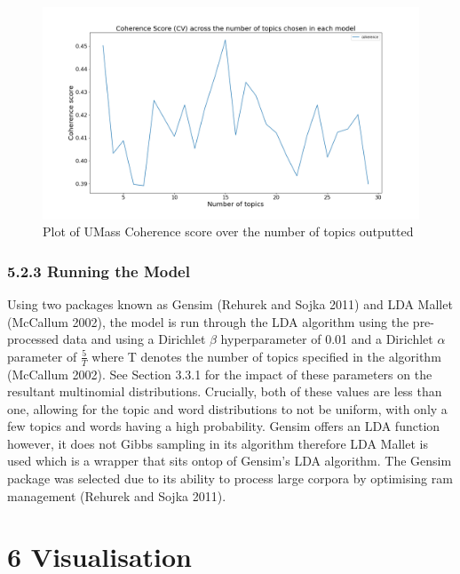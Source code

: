 \documentclass[
]{article}
\begin{document}
\begin{figure}

{\centering \includegraphics[width=1\linewidth]{images/Best_coherence_cv} 

}

\caption{Plot of UMass Coherence score over the number of topics outputted}\label{fig:cohcv}
\end{figure}

\hypertarget{running-the-model}{%
\subsubsection{5.2.3 Running the Model}\label{running-the-model}}

Using two packages known as Gensim (Rehurek and Sojka 2011) and LDA
Mallet (McCallum 2002), the model is run through the LDA algorithm using
the pre-processed data and using a Dirichlet \(\beta\) hyperparameter of
0.01 and a Dirichlet \(\alpha\) parameter of \(\frac{5}{T}\) where T
denotes the number of topics specified in the algorithm (McCallum 2002).
See Section 3.3.1 for the impact of these parameters on the resultant
multinomial distributions. Crucially, both of these values are less than
one, allowing for the topic and word distributions to not be uniform,
with only a few topics and words having a high probability. Gensim
offers an LDA function however, it does not Gibbs sampling in its
algorithm therefore LDA Mallet is used which is a wrapper that sits
ontop of Gensim's LDA algorithm. The Gensim package was selected due to
its ability to process large corpora by optimising ram management
(Rehurek and Sojka 2011).

\newpage

\hypertarget{visualisation}{%
\section{6 Visualisation}\label{visualisation}}
\end{document}
